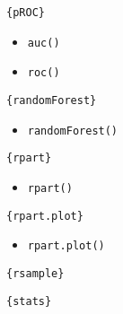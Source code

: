 \documentclass[
]{book}
\providecommand{\tightlist}{%
  \setlength{\itemsep}{0pt}\setlength{\parskip}{0pt}}
\begin{document}
\texttt{\{pROC\}}

\begin{itemize}
\tightlist
\item
  \texttt{auc()}
\item
  \texttt{roc()}
\end{itemize}

\texttt{\{randomForest\}}

\begin{itemize}
\tightlist
\item
  \texttt{randomForest()}
\end{itemize}

\texttt{\{rpart\}}

\begin{itemize}
\tightlist
\item
  \texttt{rpart()}
\end{itemize}

\texttt{\{rpart.plot\}}

\begin{itemize}
\tightlist
\item
  \texttt{rpart.plot()}
\end{itemize}

\texttt{\{rsample\}}

\texttt{\{stats\}}
\end{document}
